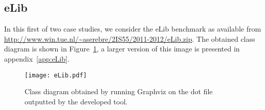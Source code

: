 \subsection{eLib}
In this first of two case studies, we consider the eLib benchmark as available from \url{http://www.win.tue.nl/~aserebre/2IS55/2011-2012/eLib.zip}.
The obtained class diagram is shown in Figure~\ref{fig:eLib}, a larger version of this image is presented in appendix~\ref{app:eLib}. 
\begin{figure}
\center
\texttt{[image: eLib.pdf]}
\caption{Class diagram obtained by running Graphviz on the dot file outputted by the developed tool.}
\label{fig:eLib}
\end{figure}